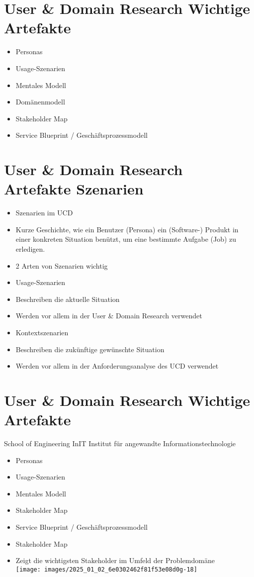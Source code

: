 \documentclass[10pt]{article}
\begin{document}
\section*{User \& Domain Research Wichtige Artefakte}
\begin{itemize}
  \item Personas
  \item Usage-Szenarien
  \item Mentales Modell
  \item Domänenmodell
  \item Stakeholder Map
  \item Service Blueprint / Geschäftsprozessmodell
\end{itemize}

\section*{User \& Domain Research Artefakte Szenarien}
\begin{itemize}
  \item Szenarien im UCD
  \item Kurze Geschichte, wie ein Benutzer (Persona) ein (Software-) Produkt in einer konkreten Situation benützt, um eine bestimmte Aufgabe (Job) zu erledigen.
  \item 2 Arten von Szenarien wichtig
  \item Usage-Szenarien
  \item Beschreiben die aktuelle Situation
  \item Werden vor allem in der User \& Domain Research verwendet
  \item Kontextszenarien
  \item Beschreiben die zukünftige gewünschte Situation
  \item Werden vor allem in der Anforderungsanalyse des UCD verwendet
\end{itemize}

\section*{User \& Domain Research Wichtige Artefakte}
School of Engineering InIT Institut für angewandte Informationstechnologie

\begin{itemize}
  \item Personas
  \item Usage-Szenarien
  \item Mentales Modell
  \item Stakeholder Map
  \item Service Blueprint / Geschäftsprozessmodell
  \item Stakeholder Map
  \item Zeigt die wichtigsten Stakeholder im Umfeld der Problemdomäne\\
\texttt{[image: images/2025\_01\_02\_6e0302462f81f53e08d0g-18]}
\end{itemize}
\end{document}
